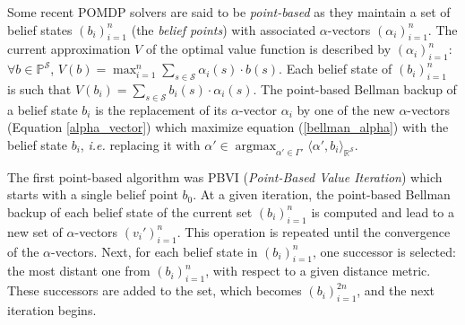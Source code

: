 Some recent POMDP solvers are said to be \textit{point-based} as they maintain
a set of belief states $(b_i)_{i=1}^n$ (the \textit{belief points}) 
with associated $\alpha$-vectors $(\alpha_i)_{i=1}^n$.
The current approximation $V$ of the optimal value function is described 
by $(\alpha_i)_{i=1}^n$: $\forall b \in \mathbb{P}^{\mathcal{S}}$,
$V(b) = \max_{i=1}^n \sum_{s \in \mathcal{S}} \alpha_i(s) \cdot b(s)$. 
Each belief state of $(b_i)_{i=1}^n$ is such that
$V(b_i) = \sum_{s \in \mathcal{S}} b_i(s) \cdot \alpha_i(s)$.
The point-based Bellman backup of a belief state $b_i$ is the replacement of its $\alpha$-vector 
$\alpha_i$ by one of the new $\alpha$-vectors (Equation \ref{alpha_vector}) 
which maximize equation (\ref{bellman_alpha}) 
with the belief state $b_i$, \textit{i.e.} replacing it with 
$\alpha' \in \operatorname*{argmax}_{\alpha' \in \Gamma'} \langle \alpha', b_i \rangle_{\mathbb{R}^{\mathcal{S}}}$.

The first point-based algorithm was PBVI (\textit{Point-Based Value Iteration})
\cite{Pineau_2003_4826} which starts with a single belief point $b_0$.
At a given iteration, the point-based Bellman backup of each belief state
of the current set $(b_i)_{i=1}^n$ is computed and lead to a new set of 
$\alpha$-vectors $(v_i')_{i=1}^n$. This operation is repeated until
the convergence of the $\alpha$-vectors. Next, for each belief state in $(b_i)_{i=1}^n$,
one successor is selected: the most distant one from $(b_i)_{i=1}^n$, 
with respect to a given distance metric.
These successors are added to the set, which becomes $(b_i)_{i=1}^{2n}$,
and the next iteration begins.

